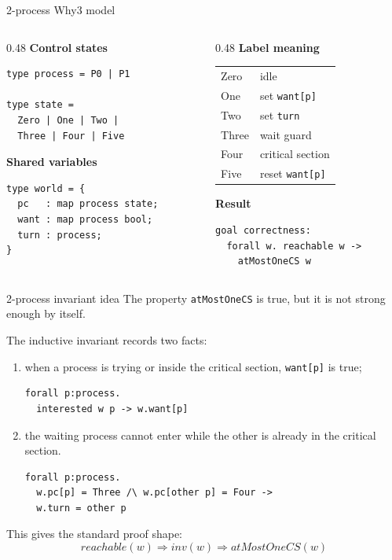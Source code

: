 \documentclass[aspectratio=169,10pt]{beamer}
\begin{document}
\begin{frame}[fragile]{2-process Why3 model}
\begin{columns}[T]
\begin{column}{0.48\textwidth}
\textbf{Control states}
\begin{lstlisting}[language=why3]
type process = P0 | P1

type state =
  Zero | One | Two |
  Three | Four | Five
\end{lstlisting}

\textbf{Shared variables}
\begin{lstlisting}[language=why3]
type world = {
  pc   : map process state;
  want : map process bool;
  turn : process;
}
\end{lstlisting}
\end{column}
\begin{column}{0.48\textwidth}
\textbf{Label meaning}
\begin{tabular}{ll}
\toprule
Zero & idle \\
One & set \texttt{want[p]} \\
Two & set \texttt{turn} \\
Three & wait guard \\
Four & critical section \\
Five & reset \texttt{want[p]} \\
\bottomrule
\end{tabular}

\vspace{0.35cm}
\textbf{Result}
\begin{lstlisting}[language=why3]
goal correctness:
  forall w. reachable w ->
    atMostOneCS w
\end{lstlisting}
\end{column}
\end{columns}
\end{frame}

\begin{frame}[fragile]{2-process invariant idea}
\vspace{0.3cm}
The property \texttt{atMostOneCS} is true, but it is not strong enough by itself.

\vspace{0.3cm}
The inductive invariant records two facts:
\begin{enumerate}
  \item when a process is trying or inside the critical section, \texttt{want[p]} is true;
\begin{lstlisting}[language=why3]
forall p:process.
  interested w p -> w.want[p]
\end{lstlisting}
  \item the waiting process cannot enter while the other is already in the critical section.
\begin{lstlisting}[language=why3]
forall p:process.
  w.pc[p] = Three /\ w.pc[other p] = Four ->
  w.turn = other p
\end{lstlisting}
\end{enumerate}

\vspace{0.1cm}
This gives the standard proof shape:
\[
  reachable(w) \Rightarrow inv(w) \Rightarrow atMostOneCS(w)
\]
\end{frame}
\end{document}
